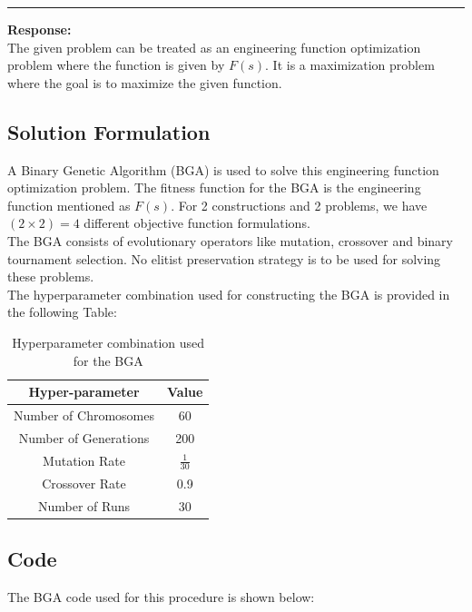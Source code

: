 \documentclass{article}
\begin{document}
	\hrule  
	\vspace{2mm}
		
	\textbf{Response:}\\
	
	The given problem can be treated as an engineering function optimization problem where the function is given by $F(s)$. It is a maximization problem where the goal is to maximize the given function.\\
	
	\subsection{Solution Formulation}
	A Binary Genetic Algorithm (BGA) is used to solve this engineering function optimization problem. The fitness function for the BGA is the engineering function mentioned as $F(s)$. For 2 constructions and 2 problems, we have $(2 \times 2) = 4$ different objective function formulations.\\
	
	The BGA consists of evolutionary operators like mutation, crossover and binary tournament selection. No elitist preservation strategy is to be used for solving these problems.\\
	
	The hyperparameter combination used for constructing the BGA is provided in the following Table:\\
	
	\begin{table}[H]
		\centering
		\begin{tabular}{|c|c|}
			\hline
			\textbf{Hyper-parameter} & \textbf{Value} \\ \hline
			Number of Chromosomes & 60 \\ 
			Number of Generations & 200 \\
			Mutation Rate & $\displaystyle \frac{1}{30}$ \\ 
			Crossover Rate & 0.9 \\ 
			Number of Runs & 30 \\ \hline
		\end{tabular}
	\caption{Hyperparameter combination used for the BGA}
	\end{table}
	
	\subsection{Code}
	 The BGA code used for this procedure is shown below:
	 
	 
\end{document}
